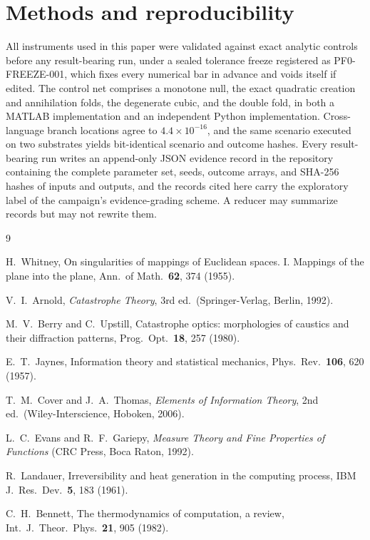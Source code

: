 \documentclass[aps,pre,reprint,nofootinbib]{revtex4-2}
\begin{document}
\section{Methods and reproducibility}
\label{sec:methods}

All instruments used in this paper were validated against exact analytic
controls before any result-bearing run, under a sealed tolerance freeze
registered as PF0-FREEZE-001, which fixes every numerical bar in advance
and voids itself if edited.  The control net comprises a monotone null, the
exact quadratic creation and annihilation folds, the degenerate cubic, and
the double fold, in both a MATLAB implementation and an independent Python
implementation.  Cross-language branch locations agree to
$4.4 \times 10^{-16}$, and the same scenario executed on two substrates
yields bit-identical scenario and outcome hashes.  Every result-bearing run
writes an append-only JSON evidence record in the repository containing the
complete parameter set, seeds, outcome arrays, and SHA-256 hashes of inputs
and outputs, and the records cited here carry the exploratory label of the
campaign's evidence-grading scheme.  A reducer may summarize records but
may not rewrite them.

\begin{thebibliography}{9}

H.~Whitney,
On singularities of mappings of Euclidean spaces. I. Mappings of the plane
into the plane,
Ann.\ of Math.\ \textbf{62}, 374 (1955).

V.~I.~Arnold,
\emph{Catastrophe Theory}, 3rd ed.\
(Springer-Verlag, Berlin, 1992).

M.~V.~Berry and C.~Upstill,
Catastrophe optics: morphologies of caustics and their diffraction patterns,
Prog.\ Opt.\ \textbf{18}, 257 (1980).

E.~T.~Jaynes,
Information theory and statistical mechanics,
Phys.\ Rev.\ \textbf{106}, 620 (1957).

T.~M.~Cover and J.~A.~Thomas,
\emph{Elements of Information Theory}, 2nd ed.\
(Wiley-Interscience, Hoboken, 2006).

L.~C.~Evans and R.~F.~Gariepy,
\emph{Measure Theory and Fine Properties of Functions}
(CRC Press, Boca Raton, 1992).

R.~Landauer,
Irreversibility and heat generation in the computing process,
IBM J.\ Res.\ Dev.\ \textbf{5}, 183 (1961).

C.~H.~Bennett,
The thermodynamics of computation, a review,
Int.\ J.\ Theor.\ Phys.\ \textbf{21}, 905 (1982).

\end{thebibliography}
\end{document}
